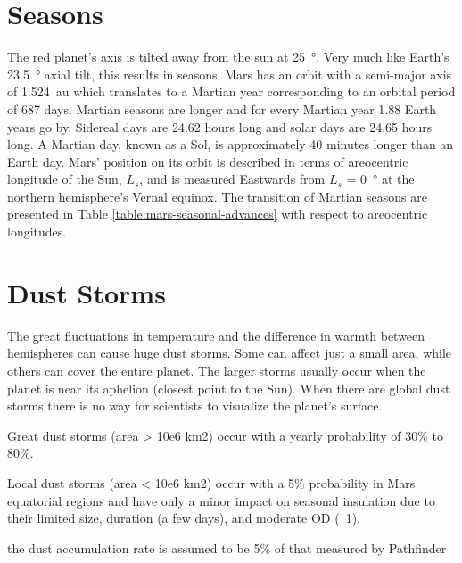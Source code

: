 %

\section{Seasons}
\label{sec:MartianEnvironment:Seasons}
The red planet's axis is tilted away from the sun at \SI{25}{\degree}. Very much like Earth's \SI{23.5}{\degree} axial tilt, this results in seasons. Mars has an orbit with a semi-major axis of \SI{1.524}{\astronomicalunit} which translates to a Martian year corresponding to an orbital period of 687 days. Martian seasons are longer and for every Martian year 1.88 Earth years go by. Sidereal days are 24.62 hours long and solar days are 24.65 hours long. A Martian day, known as a Sol, is approximately 40 minutes longer than an Earth day. Mars' position on its orbit is described in terms of areocentric longitude of the Sun, $L_{s}$, and is measured Eastwards from $L_{s}$ = \SI{0}{\degree} at the northern hemisphere's Vernal equinox. The transition of Martian seasons are presented in Table \ref{table:mars-seasonal-advances} with respect to areocentric longitudes.




\section{Dust Storms}
\label{sec:MartianEnvironment:DustStorms}

The great fluctuations in temperature and the difference in warmth between hemispheres can cause huge dust storms. Some can affect just a small area, while others can cover the entire planet. The larger storms usually occur when the planet is near its aphelion (closest point to the Sun). When there are global dust storms there is no way for scientists to visualize the planet’s surface.

Great dust storms (area > 10e6 km2) occur with a yearly probability of 30\% to 80\%. 

Local dust storms (area < 10e6 km2) occur with a 5\% probability in Mars equatorial regions and have only a minor impact on seasonal insulation due to their limited size, duration (a few days), and moderate OD (~1). 

the dust accumulation rate is assumed to be 5\% of that measured by Pathfinder 

